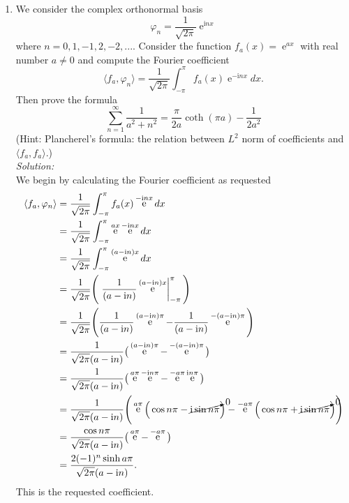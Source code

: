 \documentclass[10pt]{amsart}
\newcommand{\I}{\mathrm{i}}
\DeclareMathOperator{\E}{e}
\theoremstyle{nonumberplain}
\begin{document}
\begin{enumerate}[label={\bf {\arabic*}:}]
\newpage

\item We consider the complex orthonormal basis
$$
\varphi_n = \frac 1 {\sqrt{2 \pi}} \E^{\I n x}
$$
where $n = 0, 1, -1, 2, -2, ...$.
Consider the function $f_a(x) = \E^{ax}$ with real number $a \neq 0$ and compute the Fourier coefficient
$$
\langle f_a, \varphi_n \rangle = \frac 1 {\sqrt{2 \pi}} \int_{-\pi}^{\pi} f_a(x) \E^{- \I n x} dx.
$$
Then prove the formula
$$
\sum_{n = 1}^\infty \frac {1}{a^2 + n^2} = \frac \pi {2a} \coth (\pi a)  - \frac 1 {2a^2}
$$
(Hint: Plancherel’s formula: the relation between $L^2$ norm of coefficients and $\langle f_a, f_a \rangle$.)
\\

\noindent
\textit{Solution:} \\
We begin by calculating the Fourier coefficient as requested
\begin{align*}
\langle f_a, \varphi_n \rangle &= \frac 1 {\sqrt{2 \pi}} \int_{-\pi}^{\pi} f_a(x) \E^{- \I n x} dx \\
	&= \frac 1 {\sqrt{2 \pi}} \int_{-\pi}^{\pi} \E^{ax} \E^{- \I n x} dx \\
	&= \frac 1 {\sqrt{2 \pi}} \int_{-\pi}^{\pi} \E^{(a - \I n) x} dx \\
	&= \frac 1 {\sqrt{2 \pi}} \Bigg( \left. \frac 1 {(a - \I n)} \E^{(a - \I n) x} \right|_{-\pi}^{\pi} \Bigg) \\
	&= \frac 1 {\sqrt{2 \pi}} \Bigg( \frac 1 {(a - \I n)} \E^{(a - \I n) \pi} - \frac 1 {(a - \I n)} \E^{- (a - \I n) \pi} \Bigg) \\
	&= \frac 1 {\sqrt{2 \pi}(a - \I n)} \big( \E^{(a - \I n) \pi} - \E^{- (a - \I n) \pi} \big) \\
	&= \frac 1 {\sqrt{2 \pi}(a - \I n)} \big( \E^{a\pi} \E^{- \I n \pi} - \E^{- a\pi} \E^{ \I n \pi} \big) \\
	&= \frac 1 {\sqrt{2 \pi}(a - \I n)} \Bigg( \E^{a\pi} \Big( \cos{n \pi} - \cancelto{0}{\I \sin n \pi} \Big) - \E^{- a\pi} \Big( \cos{n \pi} + \cancelto{0}{\I \sin n \pi} \Big) \Bigg) \\
	&= \frac {\cos{n \pi}} {\sqrt{2 \pi}(a - \I n)} \big( \E^{a\pi} - \E^{- a\pi} \big) \\
	&= \frac {2 (-1)^n \sinh a \pi} {\sqrt{2 \pi}(a - \I n)}.
\end{align*}
This is the requested coefficient.


\end{enumerate}
\end{document}
